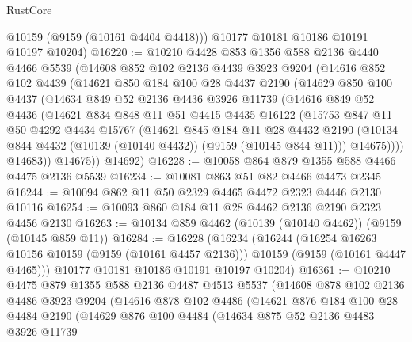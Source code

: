 \begin{lexlean}{RustCore}
\begin{coremodule}
        @10159
        (@9159 (@10161 @4404 @4418)))
      @10177
      @10181
      @10186
      @10191
      @10197
      @10204)
@16220 := @10210
    @4428
    @853
    @1356
    @588
    @2136
    @4440
    @4466
    @5539
    (@14608
      @852
      @102
      @2136
      @4439
      @3923
      @9204
      (@14616
        @852
        @102
        @4439
        (@14621
          @850
          @184
          @100
          @28
          @4437
          @2190
          (@14629
            @850
            @100
            @4437
            (@14634
              @849
              @52
              @2136
              @4436
              @3926
              @11739
              (@14616
                @849
                @52
                @4436
                (@14621
                  @834
                  @848
                  @11
                  @51
                  @4415
                  @4435
                  @16122
                  (@15753
                    @847
                    @11
                    @50
                    @4292
                    @4434
                    @15767
                    (@14621
                      @845
                      @184
                      @11
                      @28
                      @4432
                      @2190
                      (@10134 @844 @4432 (@10139 (@10140 @4432)) (@9159 (@10145 @844 @11)))
                      @14675))))
              @14683))
          @14675))
      @14692)
@16228 := @10058 @864 @879 @1355 @588 @4466 @4475 @2136 @5539
@16234 := @10081 @863 @51 @82 @4466 @4473 @2345
@16244 := @10094 @862 @11 @50 @2329 @4465 @4472 @2323 @4446 @2130 @10116
@16254 := @10093 @860 @184 @11 @28 @4462 @2136 @2190 @2323 @4456 @2130
@16263 := @10134 @859 @4462 (@10139 (@10140 @4462)) (@9159 (@10145 @859 @11))
@16284 := @16228
    (@16234
      (@16244
        (@16254 @16263 @10156 @10159 (@9159 (@10161 @4457 @2136)))
        @10159
        (@9159 (@10161 @4447 @4465)))
      @10177
      @10181
      @10186
      @10191
      @10197
      @10204)
@16361 := @10210
    @4475
    @879
    @1355
    @588
    @2136
    @4487
    @4513
    @5537
    (@14608
      @878
      @102
      @2136
      @4486
      @3923
      @9204
      (@14616
        @878
        @102
        @4486
        (@14621
          @876
          @184
          @100
          @28
          @4484
          @2190
          (@14629
            @876
            @100
            @4484
            (@14634
              @875
              @52
              @2136
              @4483
              @3926
              @11739

\end{coremodule}
\end{lexlean}
